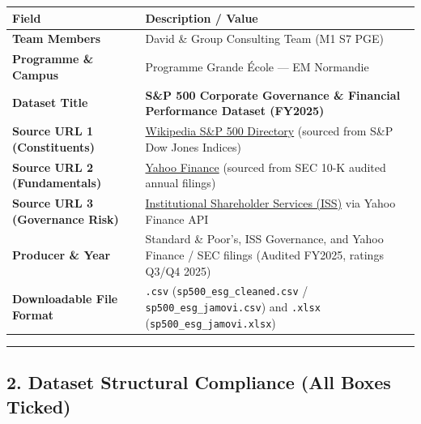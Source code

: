 \documentclass[
]{article}
\newcounter{none} %
\begin{document}
{\def\LTcaptype{none} %
\begin{longtable}[]{@{}
  >{\raggedright\arraybackslash}p{}
  >{\raggedright\arraybackslash}p{}@{}}
\toprule\noalign{}
\begin{minipage}[b]{\linewidth}\raggedright
Field
\end{minipage} & \begin{minipage}[b]{\linewidth}\raggedright
Description / Value
\end{minipage} \\
\midrule\noalign{}
\endhead
\bottomrule\noalign{}
\endlastfoot
\textbf{Team Members} & David \& Group Consulting Team (M1 S7 PGE) \\
\textbf{Programme \& Campus} & Programme Grande École --- EM
Normandie \\
\textbf{Dataset Title} & \textbf{S\&P 500 Corporate Governance \&
Financial Performance Dataset (FY2025)} \\
\textbf{Source URL 1 (Constituents)} &
\href{https://en.wikipedia.org/wiki/List_of_S\%26P_500_companies}{Wikipedia
S\&P 500 Directory} (sourced from S\&P Dow Jones Indices) \\
\textbf{Source URL 2 (Fundamentals)} &
\href{https://finance.yahoo.com}{Yahoo Finance} (sourced from SEC 10-K
audited annual filings) \\
\textbf{Source URL 3 (Governance Risk)} &
\href{https://www.issgovernance.com}{Institutional Shareholder Services
(ISS)} via Yahoo Finance API \\
\textbf{Producer \& Year} & Standard \& Poor's, ISS Governance, and
Yahoo Finance / SEC filings (Audited FY2025, ratings Q3/Q4 2025) \\
\textbf{Downloadable File Format} & \texttt{.csv}
(\texttt{sp500\_esg\_cleaned.csv} / \texttt{sp500\_esg\_jamovi.csv}) and
\texttt{.xlsx} (\texttt{sp500\_esg\_jamovi.xlsx}) \\
\end{longtable}
}

\begin{center}\rule{0.5\linewidth}{0.5pt}\end{center}

\subsection{2. Dataset Structural Compliance (All Boxes
Ticked)}\label{dataset-structural-compliance-all-boxes-ticked}
\end{document}
